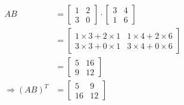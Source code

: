 \begin{solution}[\halfpage]
	\begin{align}
	   AB &= \left[ \begin{array}{cc} 1 & 2 \\ 3 & 0\end{array} \right]\cdot
	         \left[ \begin{array}{cc} 3 & 4 \\ 1 & 6 \end{array}\right] \\
	      &= \left[ 
	           \begin{array}{cc}
	              1\times 3 + 2\times 1 & 1\times 4 + 2 \times 6 \\
	              3\times 3 + 0\times 1 & 3\times 4 + 0\times 6 
	           \end{array}
	         \right] \\
	      &= \left[
	           \begin{array}{cc}
	               5 & 16 \\
	               9 & 12
	           \end{array}
	         \right] \\
	     \Rightarrow (AB)^{T} &= \left[
	                                \begin{array}{cc}
	                                   5 & 9 \\
	                                   16 & 12 
	                                \end{array}
	                             \right]
	\end{align}
\end{solution}
